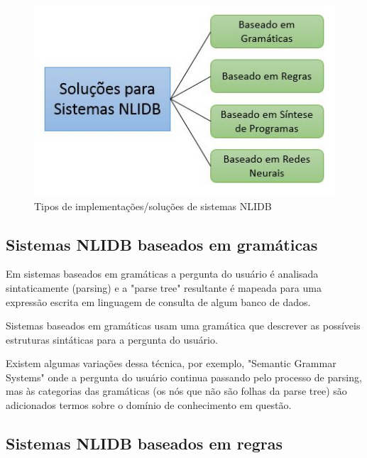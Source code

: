 \documentclass{article}
\begin{document}





\begin{figure}[h!]
\centering
\includegraphics[scale=0.7]{NLIDB.JPG}
\caption{Tipos de implementações/soluções de sistemas NLIDB}
\label{fig:SistemaNLIDB}
\end{figure}

\subsection{Sistemas NLIDB baseados em gramáticas}

Em sistemas baseados em gramáticas a pergunta do usuário é analisada sintaticamente (parsing) e a "parse tree" resultante é mapeada para uma expressão escrita em linguagem de consulta de algum banco de dados. 

Sistemas baseados em gramáticas usam uma gramática que descrever as possíveis estruturas sintáticas para a pergunta do usuário.

Existem algumas variações dessa técnica, por exemplo, "Semantic Grammar Systems" onde a pergunta do usuário continua passando pelo processo de parsing, mas às categorias das gramáticas (os nós que não são folhas da parse tree) são adicionados termos sobre o domínio de conhecimento em questão.

\subsection{Sistemas NLIDB baseados em regras}
\end{document}
